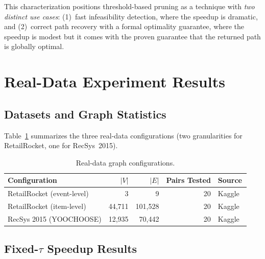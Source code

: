 This characterization positions threshold-based pruning as a technique with \emph{two distinct use cases}: (1)~fast infeasibility detection, where the speedup is dramatic, and (2)~correct path recovery with a formal optimality guarantee, where the speedup is modest but it comes with the proven guarantee that the returned path is globally optimal.

\section{Real-Data Experiment Results}\label{sec:real_results}

\subsection{Datasets and Graph Statistics}

Table~\ref{table:real_data_graphs} summarizes the three real-data configurations (two granularities for RetailRocket, one for RecSys~2015).

\begin{table}[htbp]
\centering
\small
\renewcommand{\arraystretch}{1.3}
\begin{tabular}{@{}lrrrl@{}}
\toprule
Configuration & $|V|$ & $|E|$ & Pairs Tested & Source \\
\midrule
RetailRocket (event-level)  &          3 &          9 & 20 & Kaggle~\citep{retailrocket2015} \\
RetailRocket (item-level)   &     44,711 &    101,528 & 20 & Kaggle~\citep{retailrocket2015} \\
RecSys 2015 (YOOCHOOSE)     &     12,935 &     70,442 & 20 & Kaggle~\citep{recsys2015}       \\
\bottomrule
\end{tabular}
\caption[Real-data graph configurations]{Real-data graph configurations.}
\label{table:real_data_graphs}
\end{table}

\subsection{Fixed-\texorpdfstring{$\tau$}{tau} Speedup Results}

